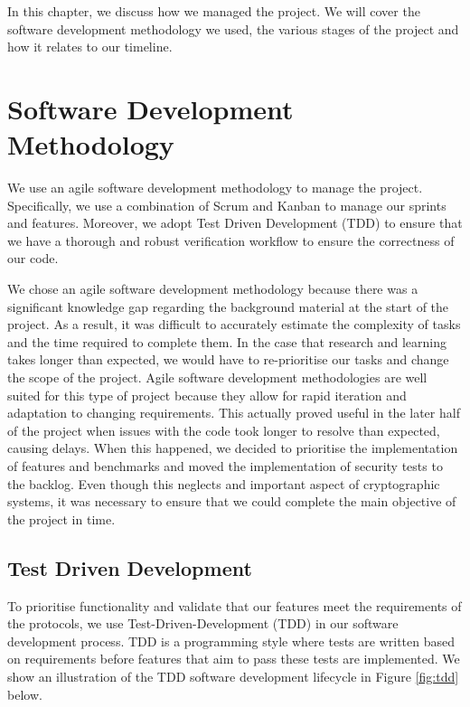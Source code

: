 In this chapter, we discuss how we managed the project. We will cover the software development 
methodology we used, the various stages of the project and how it relates to our timeline.
\section{Software Development Methodology}
We use an agile software development methodology to manage the project. Specifically, we use 
a combination of Scrum and Kanban to manage our sprints and features. Moreover, we adopt 
Test Driven Development (TDD) to ensure that we have a thorough and robust verification 
workflow to ensure the correctness of our code. 

We chose an agile software development 
methodology because there was a significant knowledge gap regarding the background material 
at the start of the project. As a result, it was difficult to accurately estimate the 
complexity of tasks and the time required to complete them. In the case that research and 
learning takes longer than expected, we would have to re-prioritise our tasks and change 
the scope of the project. 
Agile software development methodologies are well suited for this type of project because 
they allow for rapid iteration and adaptation to changing requirements. This actually 
proved useful in the later half of the project when issues with the code took longer to 
resolve than expected, causing delays. When this happened, we decided to prioritise 
the implementation of features and benchmarks and moved the implementation of security 
tests to the backlog. Even though this neglects and important aspect of cryptographic 
systems, it was necessary to ensure that we could complete the main objective of the 
project in time.

\subsection{Test Driven Development}
To prioritise functionality and validate that our features meet the requirements of the protocols, 
we use Test-Driven-Development (TDD) in our software 
development process. TDD is a programming style where tests are written 
based on requirements before features that aim to pass these tests are 
implemented. We show an illustration of the TDD software development 
lifecycle in Figure \ref{fig:tdd} below.

